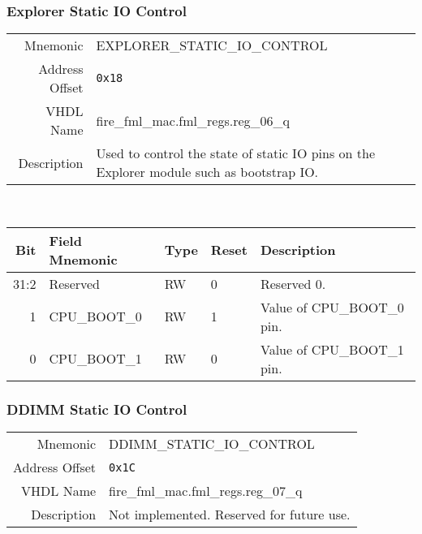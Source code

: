 \subsubsection{Explorer Static IO Control}
\begin{tabular}{ r | p{350px} }
  Mnemonic       & EXPLORER\_STATIC\_IO\_CONTROL       \\
  Address Offset & \texttt{0x18}                       \\
  VHDL Name      & fire\_fml\_mac.fml\_regs.reg\_06\_q \\ \hline

  Description &
  Used to control the state of static IO pins on the Explorer module
  such as bootstrap IO. \\
\end{tabular}
\\
\begin{tabularx}{\textwidth}{r|l|l|l|X}
  \hline
  Bit   & Field Mnemonic                   & Type & Reset & Description \\ \hline

  31:2  & Reserved                         & RW   & 0     &

  Reserved 0. \\

  1     & CPU\_BOOT\_0                     & RW   & 1     &

  Value of CPU\_BOOT\_0 pin. \\

  0     & CPU\_BOOT\_1                     & RW   & 0     &

  Value of CPU\_BOOT\_1 pin. \\
\end{tabularx}

\subsubsection{DDIMM Static IO Control}
\begin{tabular}{ r | p{350px} }
  Mnemonic       & DDIMM\_STATIC\_IO\_CONTROL          \\
  Address Offset & \texttt{0x1C}                       \\
  VHDL Name      & fire\_fml\_mac.fml\_regs.reg\_07\_q \\ \hline

  Description &
  Not implemented. Reserved for future use. \\
\end{tabular}
